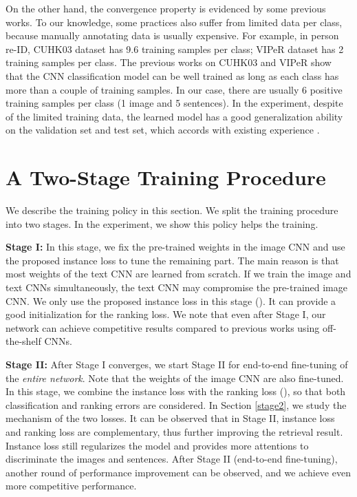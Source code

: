 \documentclass[10pt,final,journal]{IEEEtran}
\begin{document}
On the other hand, the convergence property is evidenced by some previous works. To our knowledge, some practices also suffer from limited data per class, because manually annotating data is usually expensive. For example, in person re-ID, CUHK03 dataset \cite{li2014deepreid} has 9.6 training samples per class; VIPeR dataset \cite{gray2007evaluating} has 2 training samples per class. The previous works \cite{zheng2016discriminatively, qian2017multi} on CUHK03 and VIPeR show that the CNN classification model can be well trained as long as each class has more than a couple of training samples. In our case, there are usually 6 positive training samples per class (1 image and 5 sentences). In the experiment, despite of the limited training data, the learned model has a good generalization ability on the validation set and test set, which accords with existing experience \cite{zheng2016discriminatively, qian2017multi}. 





\section{A Two-Stage Training Procedure}\label{sec:two-stage}
We describe the training policy in this section. We split the training procedure into two stages. In the experiment, we show this policy helps the training.

\textbf{Stage I:} In this stage, we fix the pre-trained weights in the image CNN and use the proposed instance loss to tune the remaining part. The main reason is that most weights of the text CNN are learned from scratch. If we train the image and text CNNs simultaneously, the text CNN may compromise the pre-trained image CNN. We only use the proposed instance loss in this stage (). It can provide a good initialization for the ranking loss. We note that even after Stage I, our network can achieve competitive results compared to previous works using off-the-shelf CNNs. 

\textbf{Stage II:} After Stage I converges, we start Stage II for end-to-end fine-tuning of the \emph{entire network}. Note that the weights of the image CNN are also fine-tuned. In this stage, we combine the instance loss with the ranking loss (), so that both classification and ranking errors are considered. In Section \ref{stage2}, we study the mechanism of the two losses. It can be observed that in Stage II, instance loss and ranking loss are complementary, thus further improving the retrieval result. Instance loss still regularizes the model and provides more attentions to discriminate the images and sentences. After Stage II (end-to-end fine-tuning), another round of performance improvement can be observed, and we achieve even more competitive performance.
\end{document}
